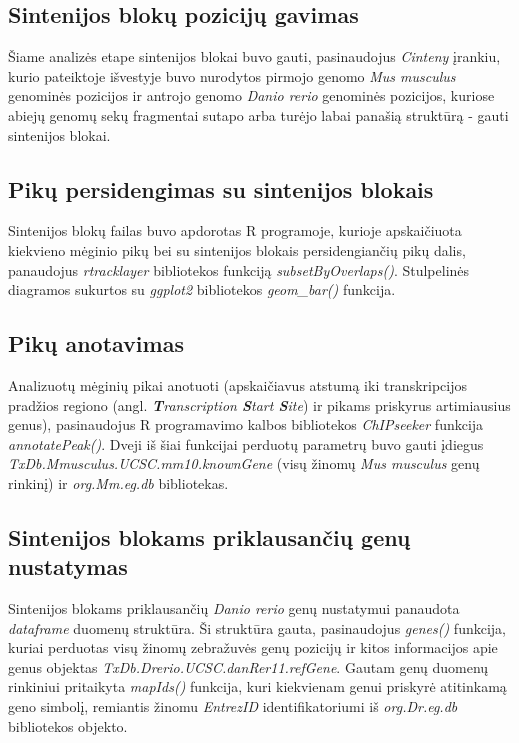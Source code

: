 \documentclass[12pt]{article}
\begin{document}
\subsection{Sintenijos blokų pozicijų gavimas}
Šiame analizės etape sintenijos blokai buvo gauti, pasinaudojus \emph{Cinteny}
įrankiu, kurio pateiktoje išvestyje buvo nurodytos pirmojo genomo
\emph{Mus musculus} genominės pozicijos ir antrojo genomo \emph{Danio rerio}
genominės pozicijos, kuriose abiejų genomų sekų fragmentai sutapo arba turėjo
labai panašią struktūrą - gauti sintenijos blokai.

\subsection{Pikų persidengimas su sintenijos blokais}
Sintenijos blokų failas buvo apdorotas R programoje, kurioje apskaičiuota
kiekvieno mėginio pikų bei su sintenijos blokais persidengiančių pikų dalis,
panaudojus \emph{rtracklayer}\cite{R_TRACK} bibliotekos funkciją
\emph{subsetByOverlaps()}. Stulpelinės diagramos sukurtos su
\emph{ggplot2}\cite{R_GGPLOT} bibliotekos \emph{geom\_bar()} funkcija.

\subsection{Pikų anotavimas}
Analizuotų mėginių pikai anotuoti (apskaičiavus atstumą iki transkripcijos
pradžios regiono (angl. \emph{\textbf{T}ranscription \textbf{S}tart
\textbf{S}ite}) ir pikams priskyrus artimiausius genus), pasinaudojus R
programavimo kalbos bibliotekos \emph{ChIPseeker}\cite{CHIP1, CHIP2} funkcija
\emph{annotatePeak()}. Dveji iš šiai funkcijai perduotų parametrų buvo gauti
įdiegus \emph{TxDb.Mmusculus.UCSC.mm10.knownGene}\cite{KNOWN_GENE} (visų žinomų
\emph{Mus musculus} genų rinkinį) ir \emph{org.Mm.eg.db}\cite{MM_ANNOT}
bibliotekas.

\subsection{Sintenijos blokams priklausančių genų nustatymas}
Sintenijos blokams priklausančių \emph{Danio rerio} genų nustatymui panaudota
\emph{dataframe} duomenų struktūra. Ši struktūra gauta, pasinaudojus
\emph{genes()} funkcija, kuriai perduotas visų žinomų zebražuvės genų pozicijų
ir kitos informacijos apie genus objektas
\emph{TxDb.Drerio.UCSC.danRer11.\-refGene}\cite{REF_GENE}. Gautam genų duomenų
rinkiniui pritaikyta \emph{mapIds()} funkcija, kuri kiekvienam genui priskyrė
atitinkamą geno simbolį, remiantis žinomu \emph{EntrezID} identifikatoriumi iš
\emph{org.Dr.eg.db}\cite{DR_ANNOT} bibliotekos objekto.
\end{document}
